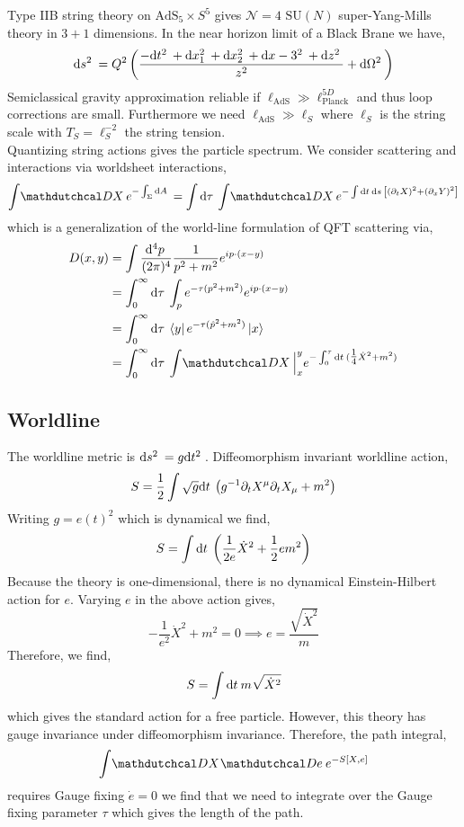 \documentclass[12pt]{extarticle}
\newcommand{\AdS}[1]{\mathrm{AdS}_{#1}}
\begin{document}
Type IIB string theory on $\AdS{5} \times S^5$ gives $\mathcal{N} = 4$ $\mathrm{SU}(N)$ super-Yang-Mills theory in $3+1$ dimensions. In the near horizon limit of a Black Brane we have,
\[ \mathrm{d}s^2 \: = Q^2 \left( \frac{-\mathrm{d}t^2 \: + \mathrm{d}x_1^2 \: + \mathrm{d}x_2^2 \: + \mathrm{d}x-3^2 \: + \mathrm{d}z^2 \:}{z^2} + \mathrm{d}\Omega^2 \: \right) \]
Semiclassical gravity approximation reliable if $ \ell_{\text{AdS}} \gg \ell_{\text{Planck}}^{5D}$ and thus loop corrections are small. Furthermore we need $\ell_{\text{AdS}} \gg \ell_{S}$ where $\ell_{S}$ is the string scale with $T_S = \ell_S^{-2}$ the string tension.
\bigskip\\
Quantizing string actions gives the particle spectrum. We consider scattering and interactions via worldsheet interactions,
\[ \int \pathd{X} e^{- \int_{\Sigma} \d{A}} = \int \d{\tau} \int \pathd{X} e^{- \int \d{t} \d{s} \left[ (\partial_t X)^2 + (\partial_x Y)^2 \right]} \]
which is a generalization of the world-line formulation of QFT scattering via,
\begin{align*}
D(x, y) & = \int \frac{\dn{4}{p}}{(2 \pi)^4} \frac{1}{p^2 + m^2} e^{i p \cdot (x - y)}
\\
& = \int_0^\infty \d{\tau} \int_p e^{-\tau(p^2 + m^2)} e^{i p \cdot (x - y)} 
\\
& = \int_0^\infty \d{\tau} \bra{y} e^{-\tau(\hat{p}^2 + m^2)} \ket{x} 
\\
& = \int_0^\infty \d{\tau} \int \pathd{X} \Big|_x^y e^{-\int_0^\tau \d{t} (\tfrac{1}{4} \dot{X}^2 + m^2)} 
\end{align*}

\subsection{Worldline}

The worldline metric is $\mathrm{d}s^2 \: = g \mathrm{d}t^2 \:$. 
Diffeomorphism invariant worldline action,
\[ S = \frac{1}{2} \int \sqrt{g} \mathrm{d}t \: \left( g^{-1} \partial_t X^\mu \partial_t X_\mu + m^2 \right) \]
Writing $g = e(t)^2$ which is dynamical we find,
\[ S = \int \mathrm{d}t \: \left( \frac{1}{2 e} \dot{X}^2 + \frac{1}{2} e m^2 \right) \]
Because the theory is one-dimensional, there is no dynamical Einstein-Hilbert action for $e$. Varying $e$ in the above action gives,
\[ - \frac{1}{e^2} \dot{X}^2 + m^2 = 0 \implies e = \frac{\sqrt{\dot{X}^2}}{m} \]
Therefore, we find,
\[ S = \int \mathrm{d}t \: m \sqrt{\dot{X}^2} \]
which gives the standard action for a free particle. However, this theory has gauge invariance under diffeomorphism invariance. Therefore, the path integral,
\[ \int \pathd{X} \pathd{e} e^{-S[X, e]} \]
requires Gauge fixing $\dot{e} = 0$ we find that we need to integrate over the Gauge fixing parameter $\tau$ which gives the length of the path. 
\end{document}
